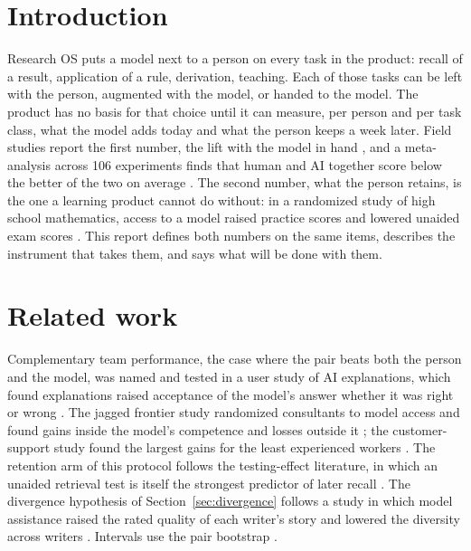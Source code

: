 \documentclass[11pt]{article}
\begin{document}
\section{Introduction}
\label{sec:intro}

Research OS puts a model next to a person on every task in the product: recall of a result, application of a rule, derivation, teaching. Each of those tasks can be left with the person, augmented with the model, or handed to the model. The product has no basis for that choice until it can measure, per person and per task class, what the model adds today and what the person keeps a week later. Field studies report the first number, the lift with the model in hand \autocite{dellacqua2023jagged,brynjolfsson2023generative}, and a meta-analysis across 106 experiments finds that human and AI together score below the better of the two on average \autocite{vaccaro2024combinations}. The second number, what the person retains, is the one a learning product cannot do without: in a randomized study of high school mathematics, access to a model raised practice scores and lowered unaided exam scores \autocite{bastani2025guardrails}. This report defines both numbers on the same items, describes the instrument that takes them, and says what will be done with them.

\section{Related work}
\label{sec:related}

Complementary team performance, the case where the pair beats both the person and the model, was named and tested in a user study of AI explanations, which found explanations raised acceptance of the model's answer whether it was right or wrong \autocite{bansal2021whole}. The jagged frontier study randomized consultants to model access and found gains inside the model's competence and losses outside it \autocite{dellacqua2023jagged}; the customer-support study found the largest gains for the least experienced workers \autocite{brynjolfsson2023generative}. The retention arm of this protocol follows the testing-effect literature, in which an unaided retrieval test is itself the strongest predictor of later recall \autocite{roediger2006testing}. The divergence hypothesis of Section~\ref{sec:divergence} follows a study in which model assistance raised the rated quality of each writer's story and lowered the diversity across writers \autocite{doshi2024diversity}. Intervals use the pair bootstrap \autocite{efron1979bootstrap}.
\end{document}
